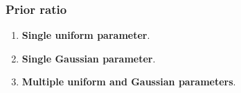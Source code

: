 \documentclass[11pt,a4paper]{article}
\begin{document}
\subsubsection{Prior ratio}

\begin{enumerate}
	\item \textbf{Single uniform parameter}.
	\item \textbf{Single Gaussian parameter}.
	\item \textbf{Multiple uniform and Gaussian parameters}.
\end{enumerate}

\FloatBarrier


\end{document}

